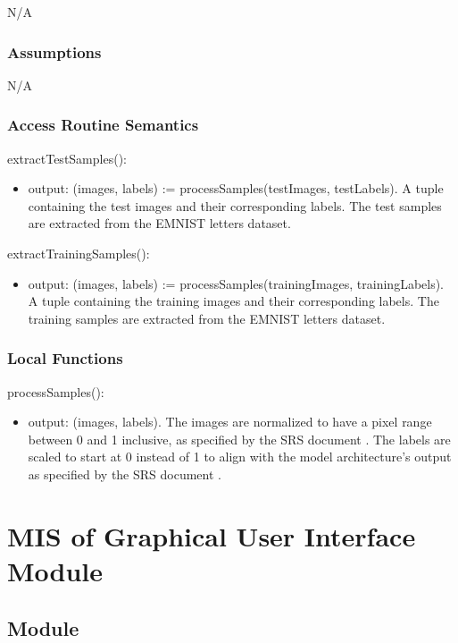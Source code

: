 \documentclass[12pt, titlepage]{article}
\begin{document}
N/A

\subsubsection{Assumptions}

N/A

\subsubsection{Access Routine Semantics}

\noindent extractTestSamples():
\begin{itemize}
\item output: (images, labels) := processSamples(testImages, testLabels). A
tuple containing the test images and their corresponding labels. The test
samples are extracted from the EMNIST letters dataset.
\end{itemize}

\noindent extractTrainingSamples():
\begin{itemize}
\item output: (images, labels) := processSamples(trainingImages, trainingLabels).
A tuple containing the training images and their corresponding labels. The
training samples are extracted from the EMNIST letters dataset.
\end{itemize}

\subsubsection{Local Functions}

\noindent processSamples():
\begin{itemize}
\item output: (images, labels). The images are normalized to have a pixel range
between 0 and 1 inclusive, as specified by the SRS document \citep{SRS}. The
labels are scaled to start at 0 instead of 1 to align with the model
architecture's output as specified by the SRS document \citep{SRS}.
\end{itemize}


\newpage
\section{MIS of Graphical User Interface Module} \label{MGUI}

\subsection{Module}
\end{document}
